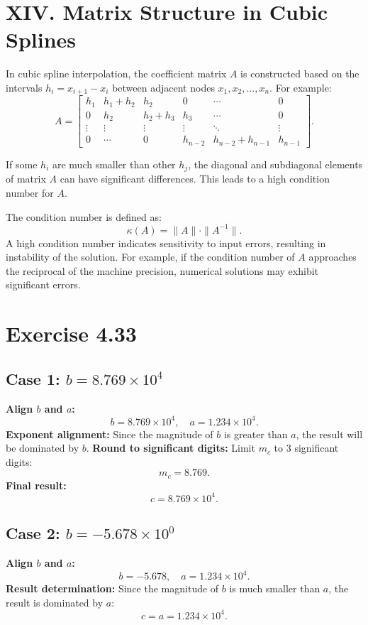 \documentclass{article}
\begin{document}
\section{XIV. Matrix Structure in Cubic Splines}
In cubic spline interpolation, the coefficient matrix \( A \) is constructed based on the intervals \( h_i = x_{i+1} - x_i \) between adjacent nodes \( x_1, x_2, \ldots, x_n \). For example:
\[
A =
\begin{bmatrix}
h_1 & h_1 + h_2 & h_2 & 0 & \cdots & 0 \\
0 & h_2 & h_2 + h_3 & h_3 & \cdots & 0 \\
\vdots & \vdots & \vdots & \vdots & \ddots & \vdots \\
0 & \cdots & 0 & h_{n-2} & h_{n-2} + h_{n-1} & h_{n-1}
\end{bmatrix}.
\]

If some \( h_i \) are much smaller than other \( h_j \), the diagonal and subdiagonal elements of matrix \( A \) can have significant differences. This leads to a high condition number for \( A \).

The condition number is defined as:
\[
\kappa(A) = \|A\| \cdot \|A^{-1}\|.
\]
A high condition number indicates sensitivity to input errors, resulting in instability of the solution. For example, if the condition number of \( A \) approaches the reciprocal of the machine precision, numerical solutions may exhibit significant errors.

\section{Exercise 4.33}
\subsection{Case 1: \( b = 8.769 \times 10^4 \)}
\textbf{Align \( b \) and \( a \):}  
   \[
   b = 8.769 \times 10^4, \quad a = 1.234 \times 10^4.
   \]
\textbf{Exponent alignment:}  
   Since the magnitude of \( b \) is greater than \( a \), the result will be dominated by \( b \).
\textbf{Round to significant digits:}  
   Limit \( m_c \) to 3 significant digits:
   \[
   m_c = 8.769.
   \]
\textbf{Final result:}  
   \[
   c = 8.769 \times 10^4.
   \]


\subsection{Case 2: \( b = -5.678 \times 10^0 \)}
\textbf{Align \( b \) and \( a \):}  
   \[
   b = -5.678, \quad a = 1.234 \times 10^4.
   \]
\textbf{Result determination:}  
   Since the magnitude of \( b \) is much smaller than \( a \), the result is dominated by \( a \):
   \[
   c = a = 1.234 \times 10^4.
   \]
\end{document}
